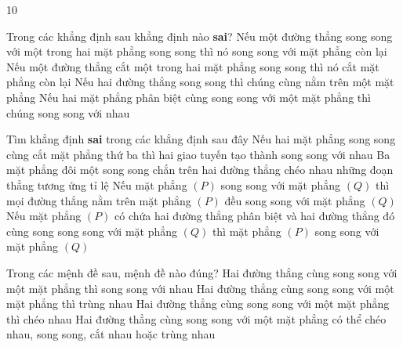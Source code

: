 \begin{indapan}{10}
	\begin{ex}%
		Trong các khẳng định sau khẳng định nào \textbf{sai}?
		\choice
		{\True Nếu một đường thẳng song song với một trong hai mặt phẳng song song thì nó song song với mặt phẳng còn lại}
		{Nếu một đường thẳng cắt một trong hai mặt phẳng song song thì nó cắt mặt phẳng còn lại}
		{Nếu hai đường thẳng song song thì chúng cùng nằm trên một mặt phẳng}
		{Nếu hai mặt phẳng phân biệt cùng song song với một mặt phẳng thì chúng song song với nhau}
	\end{ex}

	\begin{ex}%
		Tìm khẳng định \textbf{sai} trong các khẳng định sau đây
		\choice
		{Nếu hai mặt phẳng song song cùng cắt mặt phẳng thứ ba thì hai giao tuyến tạo thành song song với nhau}
		{Ba mặt phẳng đôi một song song chắn trên hai đường thẳng chéo nhau những đoạn thẳng tương ứng tỉ lệ}
		{Nếu mặt phẳng $(P)$ song song với mặt phẳng $(Q)$ thì mọi đường thẳng nằm trên mặt phẳng $(P)$ đều song song với mặt phẳng $(Q)$}
		{\True Nếu mặt phẳng $(P)$ có chứa hai đường thẳng phân biệt và hai đường thẳng đó cùng song song song với mặt phẳng $(Q)$ thì mặt phẳng $(P)$ song song với mặt phẳng $(Q)$}
	\end{ex}

	\begin{ex}%
		Trong các mệnh đề sau, mệnh đề nào đúng?
		\choice
		{Hai đường thẳng cùng song song với một mặt phẳng thì song song với nhau}
		{Hai đường thẳng cùng song song với một mặt phẳng thì trùng nhau}
		{Hai đường thẳng cùng song song với một mặt phẳng thì chéo nhau}
		{\True Hai đường thẳng cùng song song với một mặt phẳng có thể chéo nhau, song song, cắt nhau hoặc trùng nhau}
	\end{ex}


\end{indapan}
